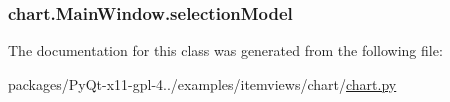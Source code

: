 \subsubsection[{selection\+Model}]{\setlength{\rightskip}{0pt plus 5cm}chart.\+Main\+Window.\+selection\+Model}\label{classchart_1_1MainWindow_a7cb915d8f2defed78220e890f815298f}


The documentation for this class was generated from the following file\+:\begin{DoxyCompactItemize}
\item 
packages/\+Py\+Qt-\/x11-\/gpl-\/4../examples/itemviews/chart/\hyperlink{chart_8py}{chart.\+py}\end{DoxyCompactItemize}
